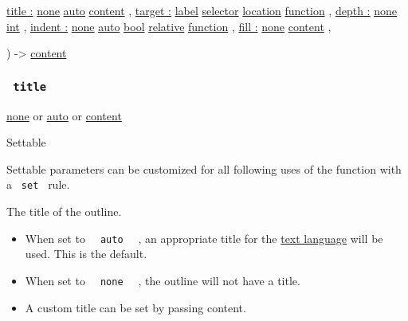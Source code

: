 { \hyperref[parameters-title]{title :}
\href{/docs/reference/foundations/none/}{none}
\href{/docs/reference/foundations/auto/}{auto}
\href{/docs/reference/foundations/content/}{content} , } {
\hyperref[parameters-target]{target :}
\href{/docs/reference/foundations/label/}{label}
\href{/docs/reference/foundations/selector/}{selector}
\href{/docs/reference/introspection/location/}{location}
\href{/docs/reference/foundations/function/}{function} , } {
\hyperref[parameters-depth]{depth :}
\href{/docs/reference/foundations/none/}{none}
\href{/docs/reference/foundations/int/}{int} , } {
\hyperref[parameters-indent]{indent :}
\href{/docs/reference/foundations/none/}{none}
\href{/docs/reference/foundations/auto/}{auto}
\href{/docs/reference/foundations/bool/}{bool}
\href{/docs/reference/layout/relative/}{relative}
\href{/docs/reference/foundations/function/}{function} , } {
\hyperref[parameters-fill]{fill :}
\href{/docs/reference/foundations/none/}{none}
\href{/docs/reference/foundations/content/}{content} , }

) -\textgreater{} \href{/docs/reference/foundations/content/}{content}

\subsubsection{\texorpdfstring{\texttt{\ title\ }}{ title }}\label{parameters-title}

\href{/docs/reference/foundations/none/}{none} {or}
\href{/docs/reference/foundations/auto/}{auto} {or}
\href{/docs/reference/foundations/content/}{content}

{{ Settable }}

\label{parameters-title-settable-tooltip}
Settable parameters can be customized for all following uses of the
function with a \texttt{\ set\ } rule.

The title of the outline.

\begin{itemize}
\tightlist
\item
  When set to \texttt{\ }{\texttt{\ auto\ }}\texttt{\ } , an appropriate
  title for the \href{/docs/reference/text/text/\#parameters-lang}{text
  language} will be used. This is the default.
\item
  When set to \texttt{\ }{\texttt{\ none\ }}\texttt{\ } , the outline
  will not have a title.
\item
  A custom title can be set by passing content.
\end{itemize}

